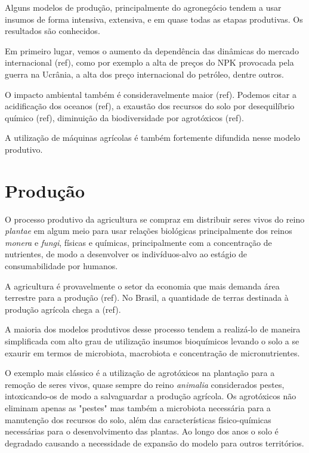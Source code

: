 \documentclass[]{article}
\begin{document}
	Alguns modelos de produção, principalmente do agronegócio tendem a usar insumos de forma intensiva, extensiva, e em quase todas as etapas produtivas. Os resultados são conhecidos. 
	
	Em primeiro lugar, vemos o aumento da dependência das dinâmicas do mercado internacional (ref), como por exemplo a alta de preços do NPK provocada pela guerra na Ucrânia, a alta dos preço internacional do petróleo, dentre outros.
	
	O impacto ambiental também é consideravelmente maior (ref). Podemos citar a acidificação dos oceanos (ref), a exaustão dos recursos do solo por desequilíbrio químico (ref), diminuição da biodiversidade por agrotóxicos (ref).
	
	A utilização de máquinas agrícolas é também fortemente difundida nesse modelo produtivo. 
	
	
	
	
	\section{Produção}
	
	O processo produtivo da agricultura se compraz em distribuir seres vivos do reino \textit{plantae} em algum meio para usar relações biológicas principalmente dos reinos \textit{monera} e \textit{fungi}, físicas e químicas, principalmente com a concentração de nutrientes, de modo a desenvolver os indivíduos-alvo ao estágio de consumabilidade por humanos. 
	
	A agricultura é provavelmente o setor da economia que mais demanda área terrestre para a produção (ref). No Brasil, a quantidade de terras destinada à produção agrícola chega a (ref). 
	
	A maioria dos modelos produtivos desse processo tendem a realizá-lo de maneira simplificada com alto grau de utilização insumos bioquímicos levando o solo a se exaurir em termos de microbiota, macrobiota e concentração de micronutrientes. 
	
	O exemplo mais clássico é a utilização de agrotóxicos na plantação para a remoção de seres vivos, quase sempre do reino \textit{animalia} considerados pestes, intoxicando-os de modo a salvaguardar a produção agrícola. Os agrotóxicos não eliminam apenas as "pestes" mas também a microbiota necessária para a manutenção dos recursos do solo, além das características físico-químicas necessárias para o desenvolvimento das plantas. Ao longo dos anos o solo é degradado causando a necessidade de expansão do modelo para outros territórios.
	
\end{document}

